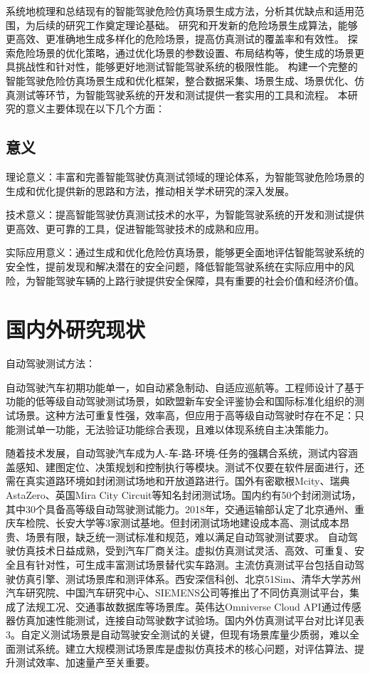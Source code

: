 系统地梳理和总结现有的智能驾驶危险仿真场景生成方法，分析其优缺点和适用范围，为后续的研究工作奠定理论基础。
研究和开发新的危险场景生成算法，能够更高效、更准确地生成多样化的危险场景，提高仿真测试的覆盖率和有效性。
探索危险场景的优化策略，通过优化场景的参数设置、布局结构等，使生成的场景更具挑战性和针对性，能够更好地测试智能驾驶系统的极限性能。
构建一个完整的智能驾驶危险仿真场景生成和优化框架，整合数据采集、场景生成、场景优化、仿真测试等环节，为智能驾驶系统的开发和测试提供一套实用的工具和流程。
本研究的意义主要体现在以下几个方面：

\subsection{意义}
理论意义：丰富和完善智能驾驶仿真测试领域的理论体系，为智能驾驶危险场景的生成和优化提供新的思路和方法，推动相关学术研究的深入发展。

技术意义：提高智能驾驶仿真测试技术的水平，为智能驾驶系统的开发和测试提供更高效、更可靠的工具，促进智能驾驶技术的成熟和应用。

实际应用意义：通过生成和优化危险仿真场景，能够更全面地评估智能驾驶系统的安全性，提前发现和解决潜在的安全问题，降低智能驾驶系统在实际应用中的风险，为智能驾驶车辆的上路行驶提供安全保障，具有重要的社会价值和经济价值。

\section{国内外研究现状}

自动驾驶测试方法：

自动驾驶汽车初期功能单一，如自动紧急制动、自适应巡航等。工程师设计了基于功能的低等级自动驾驶测试场景，如欧盟新车安全评鉴协会和国际标准化组织的测试场景。这种方法可重复性强，效率高，但应用于高等级自动驾驶时存在不足：只能测试单一功能，无法验证功能综合表现，且难以体现系统自主决策能力。

随着技术发展，自动驾驶汽车成为人-车-路-环境-任务的强耦合系统，测试内容涵盖感知、建图定位、决策规划和控制执行等模块。测试不仅要在软件层面进行，还需在真实道路环境如封闭测试场地和开放道路进行。国外有密歇根Mcity、瑞典AstaZero、英国Mira City Circuit等知名封闭测试场。国内约有50个封闭测试场，其中30个具备高等级自动驾驶测试能力。2018年，交通运输部认定了北京通州、重庆车检院、长安大学等3家测试基地。但封闭测试场地建设成本高、测试成本昂贵、场景有限，缺乏统一测试标准和规范，难以满足自动驾驶测试要求。
自动驾驶仿真技术日益成熟，受到汽车厂商关注。虚拟仿真测试灵活、高效、可重复、安全且有针对性，可生成丰富测试场景替代实车路测。主流仿真测试平台包括自动驾驶仿真引擎、测试场景库和测评体系。西安深信科创、北京51Sim、清华大学苏州汽车研究院、中国汽车研究中心、SIEMENS公司等推出了不同仿真测试平台，集成了法规工况、交通事故数据库等场景库。英伟达Omniverse Cloud API通过传感器仿真加速性能测试，连接自动驾驶数字试验场。国内外仿真测试平台对比详见表3。自定义测试场景是自动驾驶安全测试的关键，但现有场景库量少质弱，难以全面测试系统。建立大规模测试场景库是虚拟仿真技术的核心问题，对评估算法、提升测试效率、加速量产至关重要。

